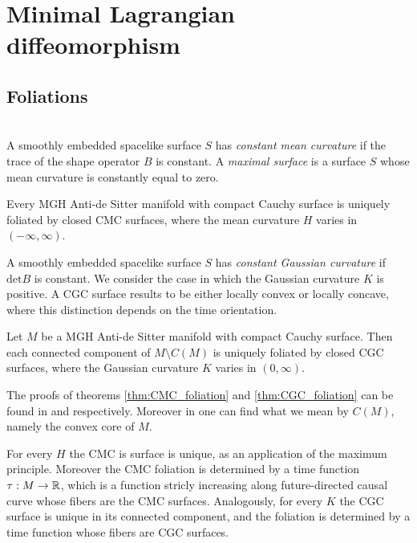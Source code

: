 \chapter{Minimal Lagrangian diffeomorphism}

\section{Foliations}
\\
A smoothly embedded spacelike surface $S$ has \textit{constant mean curvature} if the trace of the shape operator $B$ is constant. A \textit{maximal surface} is a surface $S$ whose mean curvature is constantly equal to zero.\\
\begin{theorem}\label{thm:CMC_foliation}
    Every MGH Anti-de Sitter manifold with compact Cauchy surface is uniquely foliated by closed CMC surfaces, where the mean curvature $H$ varies in $(-\infty,\infty)$.
\end{theorem}
A smoothly embedded spacelike surface $S$ has \textit{constant Gaussian curvature} if $\text{det}B$ is constant. We consider the case in which the Gaussian curvature $K$ is positive. A CGC surface results to be either locally convex or locally concave, where this distinction depends on the time orientation. 
\begin{theorem}\label{thm:CGC_foliation}
    Let $M$ be a MGH Anti-de Sitter manifold with compact Cauchy surface. Then each connected component of $M \setminus C(M)$ is uniquely foliated by closed CGC surfaces, where the Gaussian curvature $K$ varies in $(0,\infty)$.
\end{theorem}
The proofs of theorems \ref{thm:CMC_foliation} and \ref{thm:CGC_foliation} can be found in \cite{barbot2004constant} and \cite{barbot2008prescribing} respectively. Moreover in \cite{barbot2008prescribing} one can find what we mean by $C(M)$, namely the convex core of $M$.
\begin{observation}
    For every $H$ the CMC is surface is unique, as an application of the maximum principle. Moreover the CMC foliation is determined by a time function $\tau:M\to\mathbb{R}$, which is a function stricly increasing along future-directed causal curve whose fibers are the CMC surfaces. Analogously, for every $K$ the CGC surface is unique in its connected component, and the foliation is determined by a time function whose fibers are CGC surfaces.
\end{observation}
